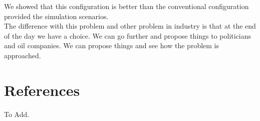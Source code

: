 \documentclass[12pt]{article}
\begin{document}
We showed that this configuration is better than the conventional configuration provided the simulation scenarios. \\

The difference with this problem and other problem in industry is that at the end of the day we have a choice. We can go further and propose things to politicians and oil companies. We can propose things and see how the problem is approached. \\

\section{References}
To Add. 
\end{document}
